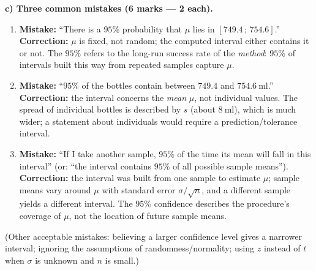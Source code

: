 \documentclass[11pt]{article}
\begin{document}
\begin{corrige}
\textbf{c) Three common mistakes (6 marks — 2 each).}
\begin{enumerate}
\item \textbf{Mistake:} ``There is a $95\%$ probability that $\mu$ lies in $[749.4\,;\,754.6]$.'' \textbf{Correction:} $\mu$ is fixed, not random; the computed interval either contains it or not. The $95\%$ refers to the long-run success rate of the \emph{method}: $95\%$ of intervals built this way from repeated samples capture $\mu$.
\item \textbf{Mistake:} ``$95\%$ of the bottles contain between $749.4$ and $754.6\ \mathrm{ml}$.'' \textbf{Correction:} the interval concerns the \emph{mean} $\mu$, not individual values. The spread of individual bottles is described by $s$ (about $8\ \mathrm{ml}$), which is much wider; a statement about individuals would require a prediction/tolerance interval.
\item \textbf{Mistake:} ``If I take another sample, $95\%$ of the time its mean will fall in this interval'' (or: ``the interval contains $95\%$ of all possible sample means''). \textbf{Correction:} the interval was built from one sample to estimate $\mu$; sample means vary around $\mu$ with standard error $\sigma/\sqrt{n}$, and a different sample yields a different interval. The $95\%$ confidence describes the procedure's coverage of $\mu$, not the location of future sample means.
\end{enumerate}
(Other acceptable mistakes: believing a larger confidence level gives a narrower interval; ignoring the assumptions of randomness/normality; using $z$ instead of $t$ when $\sigma$ is unknown and $n$ is small.)
\end{corrige}
\end{document}
